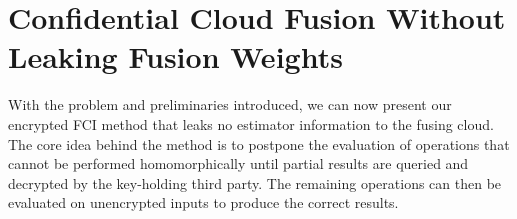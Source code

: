% 
%                                                                                           
%                                                                                           
%                                                                                           
% 

\section{Confidential Cloud Fusion Without Leaking Fusion Weights}

With the problem and preliminaries introduced, we can now present our encrypted FCI method that leaks no estimator information to the fusing cloud. The core idea behind the method is to postpone the evaluation of operations that cannot be performed homomorphically until partial results are queried and decrypted by the key-holding third party. The remaining operations can then be evaluated on unencrypted inputs to produce the correct results.

